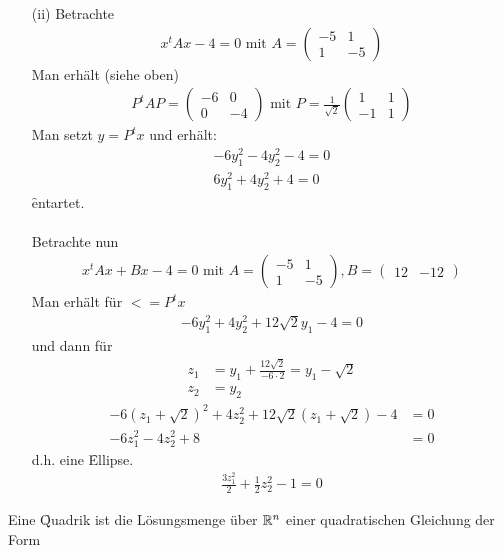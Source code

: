 \begin{itemize}
\item[(ii)] Betrachte
\begin{align}
x^t Ax - 4 = 0 \text{ mit } A = \begin{pmatrix} -5 & 1 \\ 1 & -5\end{pmatrix}
\end{align}
Man erhält (siehe oben) 
\begin{align}
P^t A P = \begin{pmatrix} -6 & 0 \\ 0 & -4 \end{pmatrix} \text{ mit } P = \frac{1}{\sqrt{2}} \begin{pmatrix} 1 & 1 \\ -1 & 1 \end{pmatrix}
\end{align}
Man setzt $y = P^t x$ und erhält:
\begin{align}
-6y_1^2 - 4y_2^2 - 4 = 0 \\
6y_1^2 + 4y_2^2 + 4 = 0
\end{align}
\f{entartet}.\\\\
Betrachte nun
\begin{align}
x^t Ax + Bx -4 = 0 \text{ mit } A = \begin{pmatrix} -5 & 1 \\ 1 & -5\end{pmatrix}, B = \begin{pmatrix} 12 & -12\end{pmatrix}
\end{align}
Man erhält für $< = P^t x$
\begin{align}
-6y_1^2 + 4y_2^2 + 12 \sqrt{2} y_1 - 4 = 0
\end{align}
und dann für
\begin{align}
z_1 &= y_1 + \frac{12\sqrt{2}}{-6 \cdot 2} = y_1 - \sqrt{2} \\
z_2 &= y_2
\end{align}
\begin{align}
-6(z_1 + \sqrt{2})^2 + 4z_2^2 + 12 \sqrt{2} (z_1 + \sqrt{2}) - 4 &= 0 \\
-6z_1^2 - 4z_2^2 + 8 &= 0
\end{align}
d.h. eine \f{Ellipse}.
\begin{align}
\frac{3z_1^2}{2} + \frac{1}{2}z_2^2 -1 = 0
\end{align}
\end{itemize}
Eine \f{Quadrik} ist die Lösungsmenge über $\mathbb{R}^n$ einer quadratischen Gleichung der Form
